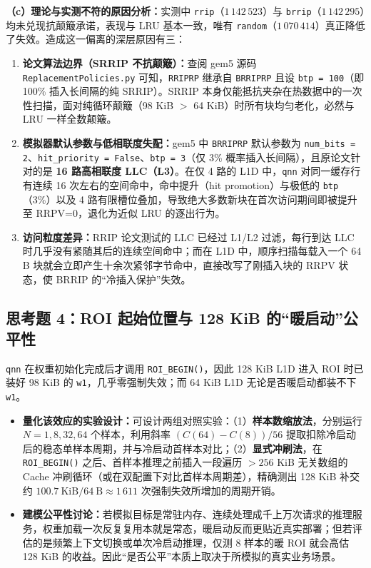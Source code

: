 \documentclass[12pt,a4paper,fontset=mac]{ctexart}
\begin{document}
\textbf{（c）理论与实测不符的原因分析：}实测中 \texttt{rrip}（$1\,142\,523$）与 \texttt{brrip}（$1\,142\,295$）均未兑现抗颠簸承诺，表现与 LRU 基本一致，唯有 \texttt{random}（$1\,070\,414$）真正降低了失效。造成这一偏离的深层原因有三：
\begin{enumerate}
  \item \textbf{论文算法边界（SRRIP 不抗颠簸）：}查阅 gem5 源码 \texttt{ReplacementPolicies.py} 可知，\texttt{RRIPRP} 继承自 \texttt{BRRIPRP} 且设 \texttt{btp = 100}（即 100\% 插入长间隔的纯 SRRIP）。SRRIP 本身仅能抵抗夹杂在热数据中的一次性扫描，面对纯循环颠簸（98 KiB $>$ 64 KiB）时所有块均匀老化，必然与 LRU 一样全数颠簸。
  \item \textbf{模拟器默认参数与低相联度失配：}gem5 中 \texttt{BRRIPRP} 默认参数为 \texttt{num\_bits = 2}、\texttt{hit\_priority = False}、\texttt{btp = 3}（仅 3\% 概率插入长间隔），且原论文针对的是 \textbf{16 路高相联度 LLC（L3）}。在仅 4 路的 L1D 中，\texttt{qnn} 对同一缓存行有连续 16 次左右的空间命中，命中提升（hit promotion）与极低的 \texttt{btp}（3\%）以及 4 路有限槽位叠加，导致绝大多数新块在首次访问期间即被提升至 RRPV=0，退化为近似 LRU 的逐出行为。
  \item \textbf{访问粒度差异：}RRIP 论文测试的 LLC 已经过 L1/L2 过滤，每行到达 LLC 时几乎没有紧随其后的连续空间命中；而在 L1D 中，顺序扫描每载入一个 64 B 块就会立即产生十余次紧邻字节命中，直接改写了刚插入块的 RRPV 状态，使 BRRIP 的“冷插入保护”失效。
\end{enumerate}

\subsection{思考题 4：ROI 起始位置与 128 KiB 的“暖启动”公平性}
\texttt{qnn} 在权重初始化完成后才调用 \texttt{ROI\_BEGIN()}，因此 128 KiB L1D 进入 ROI 时已装好 98 KiB 的 \texttt{w1}，几乎零强制失效；而 64 KiB L1D 无论是否暖启动都装不下 \texttt{w1}。
\begin{itemize}
  \item \textbf{量化该效应的实验设计：}可设计两组对照实验：（1）\textbf{样本数缩放法}，分别运行 $N = 1, 8, 32, 64$ 个样本，利用斜率 $(C(64)-C(8))/56$ 提取扣除冷启动后的稳态单样本周期，并与冷启动首样本对比；（2）\textbf{显式冲刷法}，在 \texttt{ROI\_BEGIN()} 之后、首样本推理之前插入一段遍历 $>256$ KiB 无关数组的 Cache 冲刷循环（或在双配置下对比首样本周期差），精确测出 128 KiB 补交约 $100.7\ \text{KiB} / 64\ \text{B} \approx 1\,611$ 次强制失效所增加的周期开销。
  \item \textbf{建模公平性讨论：}若模拟目标是常驻内存、连续处理成千上万次请求的推理服务，权重加载一次反复复用本就是常态，暖启动反而更贴近真实部署；但若评估的是频繁上下文切换或单次冷启动推理，仅测 8 样本的暖 ROI 就会高估 128 KiB 的收益。因此“是否公平”本质上取决于所模拟的真实业务场景。
\end{itemize}
\end{document}
